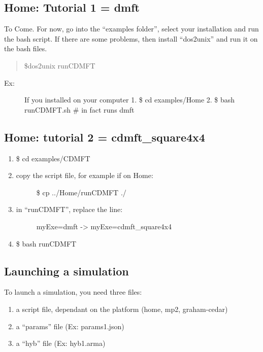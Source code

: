 \documentclass[letterpaper,10pt,english]{sphinxmanual}
\begin{document}
\subsection{Home: Tutorial 1 = dmft}
\label{\detokenize{tutorial:home-tutorial-1-dmft}}
To Come. For now, go into the ``examples folder'', select your installation and run the bash script.
If there are some problems, then install ``dos2unix'' and run it on the bash files.
\begin{quote}

\$dos2unix runCDMFT
\end{quote}
\begin{description}
\item[{Ex:}] \leavevmode
If you installed on your computer
1. \$ cd examples/Home
2. \$ bash runCDMFT.sh \# in fact runs dmft

\end{description}


\subsection{Home: tutorial 2 = cdmft\_square4x4}
\label{\detokenize{tutorial:home-tutorial-2-cdmft-square4x4}}\begin{enumerate}
\item {} 
\$ cd examples/CDMFT

\item {} \begin{description}
\item[{copy the script file, for example if on Home:}] \leavevmode
\$ cp ../Home/runCDMFT ./

\end{description}

\item {} \begin{description}
\item[{in ``runCDMFT'', replace the line:}] \leavevmode
myExe=dmft  -\textgreater{} myExe=cdmft\_square4x4

\end{description}

\item {} 
\$ bash runCDMFT

\end{enumerate}


\subsection{Launching a simulation}
\label{\detokenize{tutorial:launching-a-simulation}}
To launch a simulation, you need three files:
\begin{enumerate}
\item {} 
a script file, dependant on the platform (home, mp2, graham-cedar)

\item {} 
a ``params'' file (Ex: params1.json)

\item {} 
a ``hyb'' file (Ex: hyb1.arma)

\end{enumerate}
\end{document}
